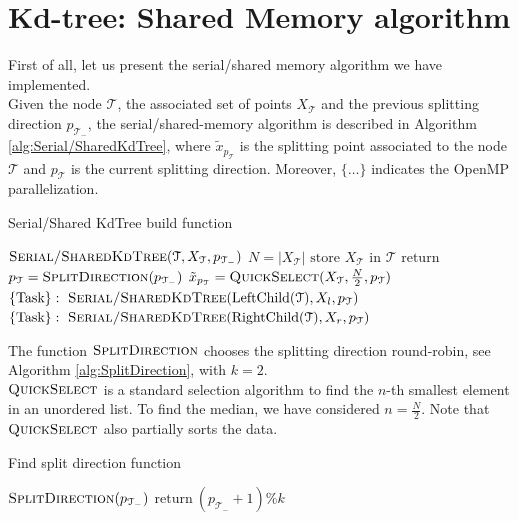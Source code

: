 \documentclass[amssymb, aps,nofootinbib, superscriptaddress, notitlepage]{revtex4}
\begin{document}
\section{Kd-tree: Shared Memory algorithm}

First of all, let us present the serial/shared memory algorithm we have implemented.
\\
Given the node $\mathcal{T}$, the associated set of points  $X_\mathcal{T}$ and  the previous splitting direction $p_{\mathcal{T}_{-}}$, the serial/shared-memory algorithm is described in Algorithm \ref{alg:Serial/SharedKdTree}, where $\tilde{x}_{p_{\mathcal{T}}}$ is the splitting point associated to the node $\mathcal{T}$ and $p_{\mathcal{T}}$ is the current splitting direction.
Moreover,  $\{\dots\}$ indicates the OpenMP parallelization.


\begin{algorithm}
\caption{Serial/Shared KdTree build function}\label{alg:Serial/SharedKdTree}
\begin{algorithmic}
\State  $\textsc{Serial/SharedKdTree}(\mathcal{T},X_\mathcal{T},p_{\mathcal{T}_{-}})$
\State $N= |X_\mathcal{T}| $
 \State $\text{store } X_\mathcal{T} \text{ in }\mathcal{T}$
  \State $\text{return}$
\EndIf
 \State $p_{\mathcal{T}}= \textsc{SplitDirection}(p_{\mathcal{T}_{-}}) $
  \State $\tilde{x}_{p_{\mathcal{T}}} = \textsc{QuickSelect}(X_\mathcal{T},\frac{N}{2},p_\mathcal{T})$
     \State $\{\text{Task}\}:\ \textsc{Serial/SharedKdTree}(\text{LeftChild}(\mathcal{T}),X_l, p_{\mathcal{T}})$
       \State $\{\text{Task}\}:\ \textsc{Serial/SharedKdTree}(\text{RightChild}(\mathcal{T}),X_r, p_{\mathcal{T}})$
\end{algorithmic}
\end{algorithm}
 
The function $\textsc{SplitDirection}$ chooses the splitting direction  round-robin, see Algorithm \ref{alg:SplitDirection}, with $k=2$.
\\
 $\textsc{QuickSelect}$ is a standard selection algorithm to find the $n$-th smallest element in an unordered list. 
To find the median, we have considered $n=\frac{N}{2}$.  
Note that $\textsc{QuickSelect}$  also partially sorts the data.


\begin{algorithm}
\caption{Find split direction function}\label{alg:SplitDirection}
\begin{algorithmic}
\State  $\textsc{SplitDirection}(p_{\mathcal{T}_{-}}) $
\State $\text{return} \ (p_{\mathcal{T}_{-}}+ 1) \% k$
\end{algorithmic}
\end{algorithm}
\end{document}
